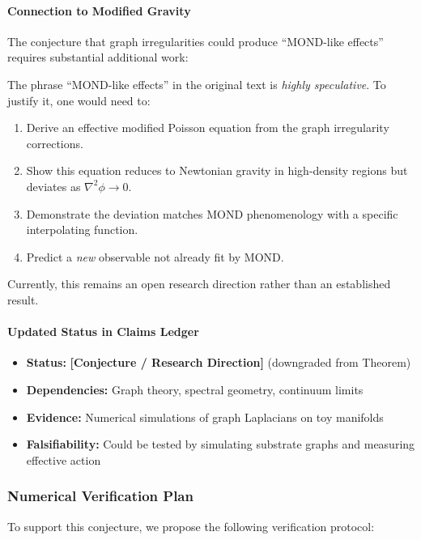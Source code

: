 \documentclass[11pt,titlepage]{article}
\begin{document}
\paragraph{Connection to Modified Gravity}
The conjecture that graph irregularities could produce ``MOND-like effects'' requires substantial additional work:

\begin{tcolorbox}[colback=red!5!white,colframe=red!75!black,title=Warning: Speculative Connection]
The phrase ``MOND-like effects'' in the original text is \emph{highly speculative}. To justify it, one would need to:
\begin{enumerate}
\item Derive an effective modified Poisson equation from the graph irregularity corrections.
\item Show this equation reduces to Newtonian gravity in high-density regions but deviates as $\nabla^2 \phi \to 0$.
\item Demonstrate the deviation matches MOND phenomenology with a specific interpolating function.
\item Predict a \emph{new} observable not already fit by MOND.
\end{enumerate}
Currently, this remains an open research direction rather than an established result.
\end{tcolorbox}

\paragraph{Updated Status in Claims Ledger}
\begin{itemize}
\item \textbf{Status:} \textbf{[Conjecture / Research Direction]} (downgraded from Theorem)
\item \textbf{Dependencies:} Graph theory, spectral geometry, continuum limits
\item \textbf{Evidence:} Numerical simulations of graph Laplacians on toy manifolds
\item \textbf{Falsifiability:} Could be tested by simulating substrate graphs and measuring effective action
\end{itemize}

\subsubsection{Numerical Verification Plan}
To support this conjecture, we propose the following verification protocol:
\end{document}
